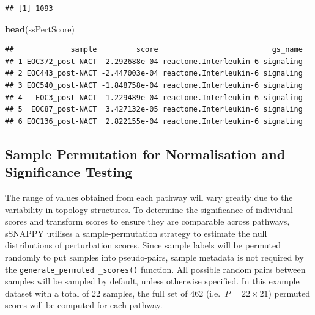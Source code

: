 \documentclass[9pt,a4paper,]{extarticle}
\newenvironment{Shaded}{\begin{snugshade}}{\end{snugshade}}
\newcommand{\AttributeTok}[1]{\textcolor[rgb]{0.13,0.29,0.53}{#1}}
\newcommand{\DecValTok}[1]{\textcolor[rgb]{0.00,0.00,0.81}{#1}}
\newcommand{\FunctionTok}[1]{\textcolor[rgb]{0.13,0.29,0.53}{\textbf{#1}}}
\newcommand{\NormalTok}[1]{#1}
\newcommand{\OtherTok}[1]{\textcolor[rgb]{0.56,0.35,0.01}{#1}}
\newcommand{\SpecialCharTok}[1]{\textcolor[rgb]{0.81,0.36,0.00}{\textbf{#1}}}
\begin{document}
\begin{Shaded}
\end{Shaded}

\begin{verbatim}
## [1] 1093
\end{verbatim}

\begin{Shaded}
\begin{Highlighting}[]
\FunctionTok{head}\NormalTok{(ssPertScore)}
\end{Highlighting}
\end{Shaded}

\begin{verbatim}
##             sample         score                          gs_name
## 1 EOC372_post-NACT -2.292688e-04 reactome.Interleukin-6 signaling
## 2 EOC443_post-NACT -2.447003e-04 reactome.Interleukin-6 signaling
## 3 EOC540_post-NACT -1.848758e-04 reactome.Interleukin-6 signaling
## 4   EOC3_post-NACT -1.229489e-04 reactome.Interleukin-6 signaling
## 5  EOC87_post-NACT  3.427132e-05 reactome.Interleukin-6 signaling
## 6 EOC136_post-NACT  2.822155e-04 reactome.Interleukin-6 signaling
\end{verbatim}

\hypertarget{sample-permutation-for-normalisation-and-significance-testing}{%
\subsection{Sample Permutation for Normalisation and Significance Testing}\label{sample-permutation-for-normalisation-and-significance-testing}}

The range of values obtained from each pathway will vary greatly due to the variability in topology structures.
To determine the significance of individual scores and transform scores to ensure they are comparable across pathways, sSNAPPY utilises a sample-permutation strategy to estimate the null distributions of perturbation scores.
Since sample labels will be permuted randomly to put samples into pseudo-pairs, sample metadata is not required by the \texttt{generate\_permuted\ \_scores()} function.
All possible random pairs between samples will be sampled by default, unless otherwise specified.
In this example dataset with a total of 22 samples, the full set of 462 (i.e.~\(P = 22 \times 21\)) permuted scores will be computed for each pathway.
\end{document}
